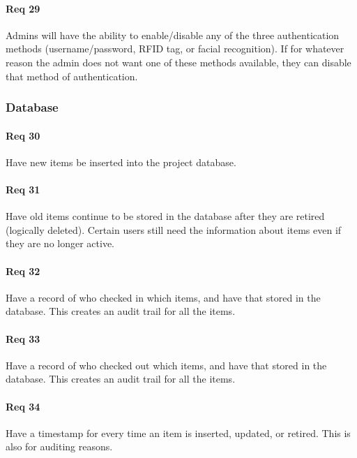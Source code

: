 \documentclass[10pt, onecolumn, twoside, peerreview]{IEEEtran}
\begin{document}
\paragraph*{Req 29} Admins will have the ability to enable/disable any of the three authentication methods (username/password, RFID tag, or
facial recognition). If for whatever reason the admin does not want one of these methods available, they can disable
that method of authentication.\\

\subsubsection{Database}
\paragraph*{Req 30} Have new items be inserted into the project database.\\

\paragraph*{Req 31} Have old items continue to be stored in the database after they are retired (logically deleted). Certain users still
need the information about items even if they are no longer active.\\

\paragraph*{Req 32}  Have a record of who checked in which items, and have that stored in the database. This creates an audit trail for all
the items.\\

\paragraph*{Req 33} Have a record of who checked out which items, and have that stored in the database. This creates an audit trail for all
the items.\\

\paragraph*{Req 34} Have a timestamp for every time an item is inserted, updated, or retired. This is also for auditing reasons.\\
\end{document}
